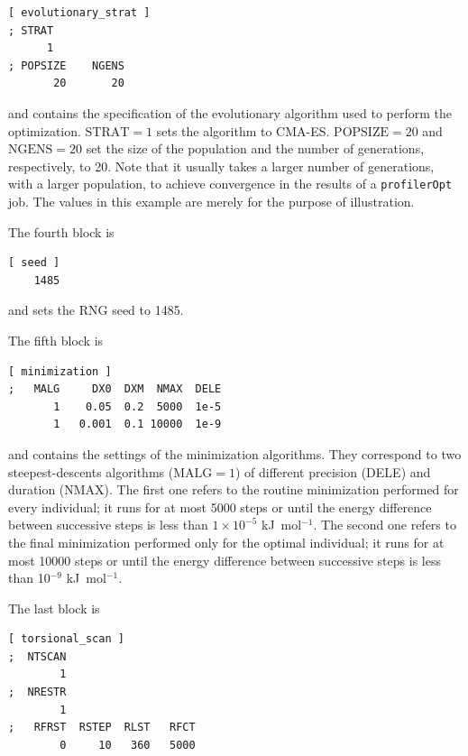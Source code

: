 \documentclass[10pt,a4paper,openany]{memoir}
\numberwithin{equation}{section}
\newcommand{\profileropt}[0]{\texttt{profilerOpt}}
\newcommand{\varset}[2]{$\text{#1}=#2$}
\begin{document}
\begin{lstlisting}[language=gromacs]
[ evolutionary_strat ]
; STRAT
      1
; POPSIZE    NGENS  
       20       20
\end{lstlisting}\vspace{2ex}\par

\noindent and contains the specification of the evolutionary algorithm
used to perform the optimization.  \varset{STRAT}{1} sets the
algorithm to CMA-ES. \varset{POPSIZE}{20} and \varset{NGENS}{20} set
the size of the population and the number of generations,
respectively, to 20. Note that it usually takes a larger number of
generations, with a larger population, to achieve convergence in the
results of a \profileropt{} job. The values in this example are merely
for the purpose of illustration.

The fourth block is

\begin{lstlisting}[language=gromacs]
[ seed ]
    1485
\end{lstlisting}\vspace{2ex}\par

\noindent and sets the RNG seed to 1485.

The fifth block is

\begin{lstlisting}[language=gromacs]
[ minimization ]
;   MALG     DX0  DXM  NMAX  DELE
       1    0.05  0.2  5000  1e-5
       1   0.001  0.1 10000  1e-9
\end{lstlisting}\vspace{2ex}\par

\noindent and contains the settings of the minimization algorithms.  They
correspond to two steepest-descents algorithms (\varset{MALG}{1}) of different
precision (DELE) and duration (NMAX).
%
The first one refers to the routine minimization performed for every individual;
it runs for at most 5000 steps or until the energy difference between successive
steps is less than $1\times 10^{-5}$ kJ~mol$^{-1}$.
%
The second one refers to the final minimization performed only for the optimal
individual; it runs for at most 10000 steps or until the energy difference
between successive steps is less than 10$^{-9}$ kJ~mol$^{-1}$.
%

The last block is

\begin{lstlisting}[language=gromacs]
[ torsional_scan ]
;  NTSCAN
        1
;  NRESTR
        1
;   RFRST  RSTEP  RLST   RFCT
        0     10   360   5000
\end{lstlisting}\vspace{2ex}\par
\end{document}
